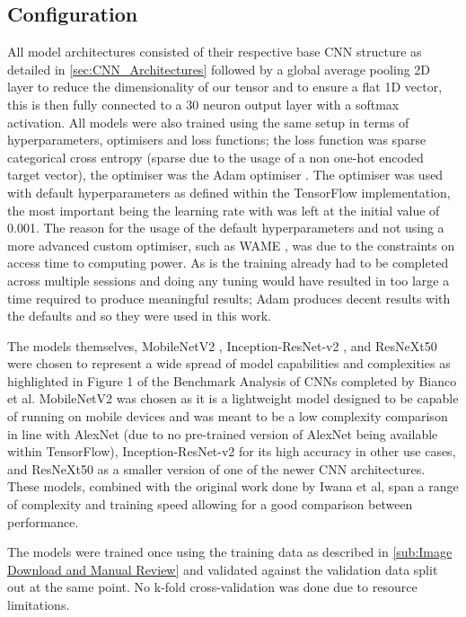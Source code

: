 \documentclass[12pt]{article}
\numberwithin{equation}{section}
\numberwithin{figure}{section}
\begin{document}
\subsection{Configuration} 
\label{sub:Configuration} 
All model architectures consisted of their respective base CNN structure as detailed in \cref{sec:CNN_Architectures} followed by a global average pooling 2D layer to reduce the dimensionality of our tensor and to ensure a flat 1D vector, this is then fully connected to a 30 neuron output layer with a softmax activation. All models were also trained using the same setup in terms of hyperparameters, optimisers and loss functions; the loss function was sparse categorical cross entropy (sparse due to the usage of a non one-hot encoded target vector), the optimiser was the Adam optimiser \cite{Kingma2015}. The optimiser was used with default hyperparameters as defined within the TensorFlow implementation, the most important being the learning rate with was left at the initial value of 0.001. The reason for the usage of the default hyperparameters and not using a more advanced custom optimiser, such as WAME \cite{Mosca2017}, was due to the constraints on access time to computing power. As is the training already had to be completed across multiple sessions and doing any tuning would have resulted in too large a time required to produce meaningful results; Adam produces decent results with the defaults and so they were used in this work.

The models themselves, MobileNetV2 \cite{Sandler2018}, Inception-ResNet-v2 \cite{Szegedy2016}, and ResNeXt50 \cite{Xie2016} were chosen to represent a wide spread of model capabilities and complexities as highlighted in Figure 1 of the Benchmark Analysis of CNNs completed by Bianco et al\cite{Bianco2018}. MobileNetV2 was chosen as it is a lightweight model designed to be capable of running on mobile devices and was meant to be a low complexity comparison in line with AlexNet (due to no pre-trained version of AlexNet being available within TensorFlow), Inception-ResNet-v2 for its high accuracy in other use cases, and ResNeXt50 as a smaller version of one of the newer CNN architectures. These models, combined with the original work done by Iwana et al, span a range of complexity and training speed allowing for a good comparison between performance.

The models were trained once using the training data as described in \cref{sub:Image Download and Manual Review} and validated against the validation data split out at the same point. No k-fold cross-validation was done due to resource limitations.
\end{document}
